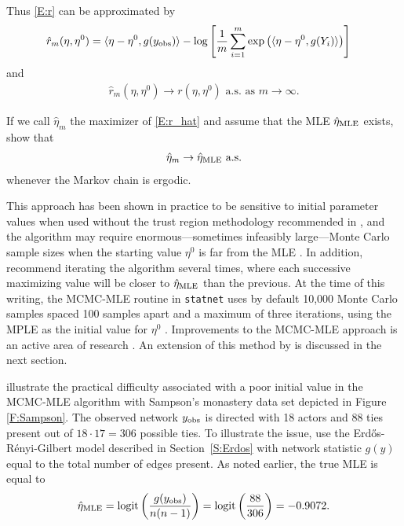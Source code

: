 Thus \eqref{E:r} can be approximated by
\begin{align}
\hat{r}_m( \eta, \eta^0 ) &= \langle  \eta - \eta^0, g(y_{\text{obs}}) \rangle - \log 
	\left [ \frac{1}{m} \sum_{i=1}^{m} \exp \left ( \langle  \eta - \eta^0, g(Y_i) \rangle \right ) \right ] 
	\label{E:r_hat}
\end{align}
and 
\begin{align*}
	\hat{r}_m( \eta, \eta^0 ) \to r( \eta, \eta^0 ) \text{ a.s. as $m \to \infty$}.
\end{align*}

If we call $\hat{\eta}_m$  the maximizer of \eqref{E:r_hat} and assume that the MLE 
$\hat{\eta}_{\textrm{MLE}}$ exists, \citeauthor{Geyer:1992} show that 
\begin{align*}
	\hat{\eta}_m \to \hat{\eta}_{\textrm{MLE}} \text{ a.s.}
\end{align*}
 whenever the Markov chain is ergodic. 
 
This approach has been shown in practice to be sensitive to initial parameter 
values when used without the trust region methodology recommended in \citep{Geyer:1992}, 
and the algorithm may require enormous---sometimes infeasibly large---Monte Carlo sample sizes 
when the starting value $\eta^0$ is far from the MLE \citep{ergm}.  
In addition, \citeauthor{Geyer:1992} recommend iterating the algorithm several times, 
where each successive maximizing value will be closer to $\hat{\eta}_{\textrm{MLE}}$ than the previous.  At the 
time of this writing, the MCMC-MLE routine in \texttt{statnet} uses by default 10,000 
Monte Carlo samples spaced 100 samples apart and a maximum of three iterations, using the 
MPLE as the initial value for $\eta^0$ \citep{statnet:R}.  
Improvements to the MCMC-MLE approach is an active area of research \citep*{Bartz}.
An extension of this method by \citet{Hummel} is discussed in the next section.

\citet{ergm} illustrate the practical difficulty associated with a poor initial 
value in the MCMC-MLE algorithm with Sampson's monastery data set depicted in 
Figure \ref{F:Sampson}.  The 
observed network $y_{\text{obs}}$ is directed with 18 actors and 88 ties present out of $18 \cdot 17=306$ possible 
ties.  To illustrate the issue, \citeauthor{ergm} use the Erd\H{o}s-R\'{e}nyi-Gilbert model 
described in Section~\ref{S:Erdos} with network statistic $g(y)$ equal to the total number of 
edges present.  As noted earlier, the true MLE is equal to 
\begin{align*}
	\hat{\eta}_{\textrm{MLE}} = \operatorname{logit}\left( \frac{g(y_{\text{obs}})}{n(n-1)}\right) = \operatorname{logit} \left( \frac{88}{306}\right ) = -0.9072.
\end{align*}
  
